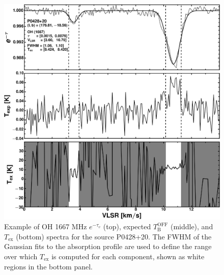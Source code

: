 \documentclass[preprint]{emulateapj}
\def\Tex{$T_{\mathrm{ex}}$}
\begin{document}
\begin{figure}
\includegraphics[width=1.0\linewidth]{fig/tex_spec_P0428+20.eps}
\caption{Example of OH 1667 MHz $e^{-\tau_{v}}$ (top), expected $T_\mathrm{B}^\mathrm{OFF}$ (middle), and $T_\mathrm{ex}$ (bottom) spectra for the source P0428+20. The FWHM of the Gaussian fits to the absorption profile are used to define the range over which $T_\mathrm{ex}$ is computed for each component, shown as white regions in the bottom panel.}
\label{fig:example_p042820}
\end{figure}
\end{document}
